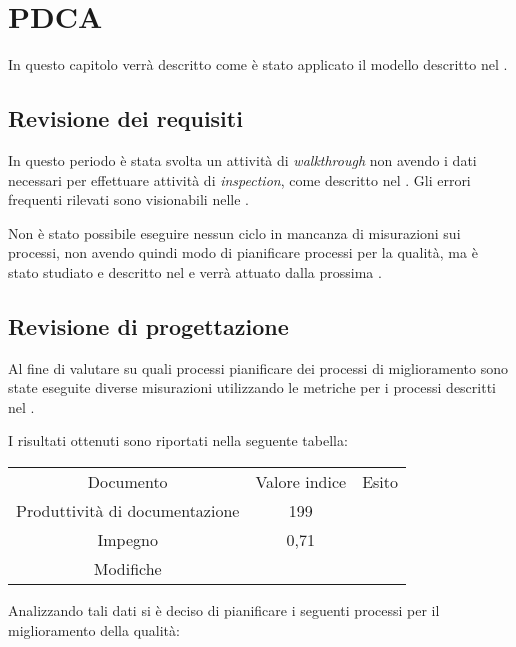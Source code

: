 \section{PDCA}
In questo capitolo verrà descritto come è stato applicato il modello  descritto nel \PianoDiQualifica.

\subsection{Revisione dei requisiti}

In questo periodo è stata svolta un attività di \emph{walkthrough} non avendo i dati necessari per effettuare attività di \emph{inspection}, come descritto nel \PianoDiQualifica. Gli errori frequenti rilevati sono visionabili nelle \NormeDiProgetto.

Non è stato possibile eseguire nessun ciclo  in mancanza di misurazioni sui processi, non avendo quindi modo di pianificare processi per la qualità, ma è stato studiato e descritto nel \PianoDiQualifica e verrà attuato dalla prossima .

\subsection{Revisione di progettazione}

Al fine di valutare su quali processi pianificare dei processi di miglioramento sono state eseguite diverse misurazioni utilizzando le metriche per i processi descritti nel \PianoDiQualifica.

I risultati ottenuti sono riportati nella seguente tabella:

\begin{tabular}{ | c | c | c | }
\hline
Documento & Valore indice & Esito \\
Produttività di documentazione & 199 \\
\hline
Impegno & 0,71 & \\
\hline
Modifiche & 

\end{tabular}

Analizzando tali dati si è deciso di pianificare i seguenti processi per il miglioramento della qualità:


  


